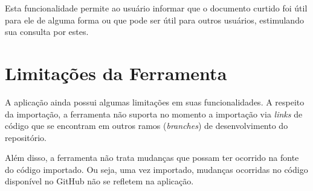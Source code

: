 Esta funcionalidade permite ao usuário informar que o documento curtido foi útil para ele de alguma forma ou que pode ser útil para outros usuários, estimulando sua consulta por estes.

\section{Limitações da Ferramenta}

A aplicação ainda possui algumas limitações em suas funcionalidades. A respeito da importação, a ferramenta não suporta no momento a importação via \textit{links} de código que se encontram em outros ramos (\textit{branches}) de desenvolvimento do repositório.

Além disso, a ferramenta não trata mudanças que possam ter ocorrido na fonte do código importado. Ou seja, uma vez importado, mudanças ocorridas no código disponível no GitHub não se refletem na aplicação.


